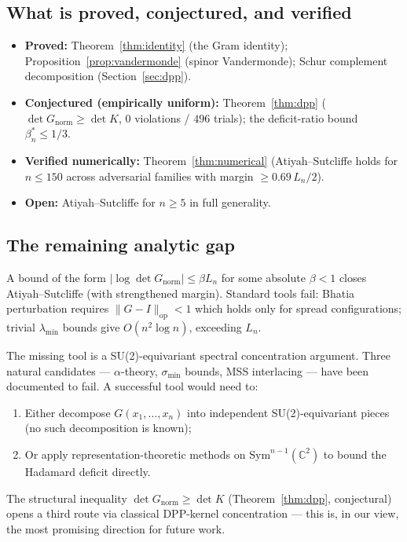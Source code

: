 \documentclass[11pt,a4paper]{article}
\begin{document}
\subsection{What is proved, conjectured, and verified}

\begin{itemize}
\item \textbf{Proved:} Theorem~\ref{thm:identity} (the Gram identity);
Proposition~\ref{prop:vandermonde} (spinor Vandermonde);
Schur complement decomposition (Section~\ref{sec:dpp}).
\item \textbf{Conjectured (empirically uniform):}
Theorem~\ref{thm:dpp} ($\det G_{\mathrm{norm}} \ge \det K$, $0$ violations / $496$ trials);
the deficit-ratio bound $\beta_n^* \le 1/3$.
\item \textbf{Verified numerically:}
Theorem~\ref{thm:numerical} (Atiyah--Sutcliffe holds for $n \le 150$ across
adversarial families with margin $\ge 0.69\,L_n/2$).
\item \textbf{Open:} Atiyah--Sutcliffe for $n \ge 5$ in full generality.
\end{itemize}

\subsection{The remaining analytic gap}

A bound of the form $\bigl|\log \det G_{\mathrm{norm}}\bigr| \le \beta L_n$ for some
absolute $\beta < 1$ closes Atiyah--Sutcliffe (with strengthened margin).
Standard tools fail: Bhatia perturbation requires $\|G - I\|_{\mathrm{op}} < 1$
which holds only for spread configurations; trivial $\lambda_{\min}$ bounds
give $O(n^2 \log n)$, exceeding $L_n$.

The missing tool is a SU(2)-equivariant spectral concentration argument.
Three natural candidates --- $\alpha$-theory, $\sigma_{\min}$ bounds, MSS
interlacing --- have been documented to fail. A successful tool would need to:
\begin{enumerate}
\item Either decompose $G(x_1, \ldots, x_n)$ into independent SU(2)-equivariant
pieces (no such decomposition is known);
\item Or apply representation-theoretic methods on $\mathrm{Sym}^{n-1}(\mathbb{C}^2)$
to bound the Hadamard deficit directly.
\end{enumerate}
The structural inequality $\det G_{\mathrm{norm}} \ge \det K$
(Theorem~\ref{thm:dpp}, conjectural) opens a third route via classical
DPP-kernel concentration --- this is, in our view, the most promising
direction for future work.
\end{document}
